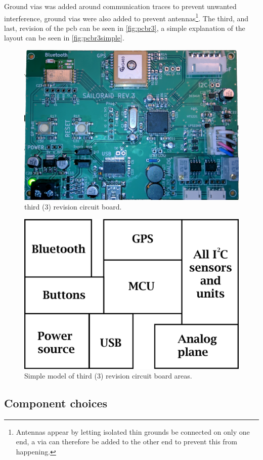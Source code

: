 Ground \gls{via}s was added around communication traces to prevent unwanted interference, ground \gls{via}s were also added to prevent antennas\footnote{Antennas appear by letting isolated thin grounds be connected on only one end, a \gls{via} can therefore be added to the other end to prevent this from happening.}.
The third, and last, revision of the \gls{pcb} can be seen in \autoref{fig:pcbr3}, a simple explanation of the layout can be seen in \autoref{fig:pcbr3simple}.
\begin{figure}[H]
	\centering
    \includegraphics[width=\linewidth]{Figures/pcb_rev3.jpg}
	\caption{third (3) revision circuit board.}
	\label{fig:pcbr3}
\end{figure}
\begin{figure}[H]
	\centering
    \includegraphics[width=.75\linewidth]{Figures/pcb_rev3_simple.png}
	\caption{Simple model of third (3) revision circuit board areas.}
	\label{fig:pcbr3simple}
\end{figure}

\subsection{Component choices}\label{sec:hw:tip1}


